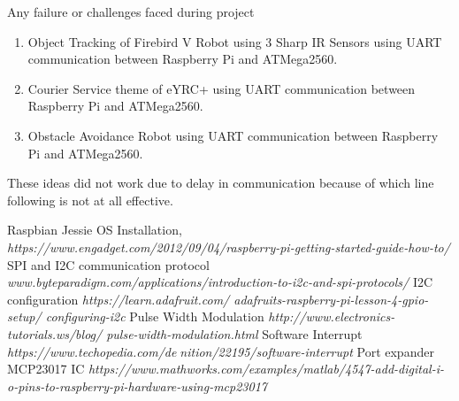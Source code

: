 \documentclass[a4paper,12pt,oneside]{book}
\begin{document}
Any failure or challenges faced during project
\begin{enumerate}
    \item Object Tracking of Firebird V Robot using 3 Sharp IR Sensors using UART communication between Raspberry Pi and ATMega2560.
    \item Courier Service theme of eYRC+ using UART communication between Raspberry Pi and ATMega2560.
    \item Obstacle Avoidance Robot using UART communication between Raspberry Pi and ATMega2560.
\end{enumerate}
These ideas did not work due to delay in communication because of which line following is not at all effective.

\begin{thebibliography}{li}
Raspbian Jessie OS Installation,
{\em https://www.engadget.com/2012/09/04/raspberry-pi-getting-started-guide-how-to/}
SPI and I2C communication protocol
{\em www.byteparadigm.com/applications/introduction-to-i2c-and-spi-protocols/}
I2C configuration
{\em https://learn.adafruit.com/
adafruits-raspberry-pi-lesson-4-gpio-setup/
configuring-i2c}
Pulse Width Modulation
{\em http://www.electronics-tutorials.ws/blog/
pulse-width-modulation.html}
Software Interrupt
{\em https://www.techopedia.com/denition/22195/software-interrupt}
Port expander MCP23017 IC
{\em https://www.mathworks.com/examples/matlab/4547-add-digital-i-o-pins-to-raspberry-pi-hardware-using-mcp23017}
\end{thebibliography}
\end{document}
